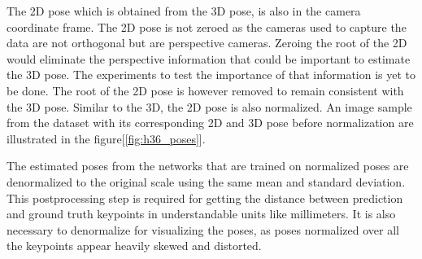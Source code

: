 The 2D pose which is obtained from the 3D pose, is also in the camera coordinate frame. The 2D pose is not zeroed as the cameras used to capture the data are not orthogonal but are perspective cameras. Zeroing the root of the 2D would eliminate the perspective information that could be important to estimate the 3D pose. The experiments to test the importance of that information is yet to be done. The root of the 2D pose is however removed to remain consistent with the 3D pose. Similar to the 3D, the 2D pose is also normalized. An image sample from the dataset with its corresponding 2D and 3D pose before normalization are illustrated in the figure[\ref{fig:h36_poses}].


The estimated poses from the networks that are trained on normalized poses are denormalized to the original scale using the same mean and standard deviation. This postprocessing step is required for getting the distance between prediction and ground truth keypoints in understandable units like millimeters. It is also necessary to denormalize for visualizing the poses, as poses normalized over all the keypoints appear heavily skewed and distorted.


